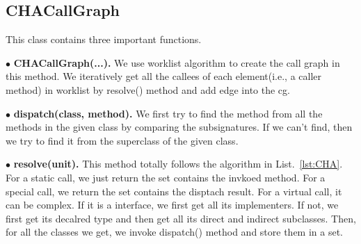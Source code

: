 \documentclass[conference]{IEEEtran}
\begin{document}
\subsection{CHACallGraph}
This class contains three important functions.

\noindent $\bullet$ \textbf{CHACallGraph(...). } We use worklist algorithm to create the  call graph in this method. We iteratively get all the callees of each element(i.e., a caller method) in worklist by resolve() method and add edge into the cg.

\noindent $\bullet$ \textbf{dispatch(class, method). } We first try to find the method from all the methods in the given class by comparing the subsignatures. If we can't find, then we try to find it from the superclass of the given class.

\noindent $\bullet$ \textbf{resolve(unit). } This method totally follows the algorithm in List.~\ref{lst:CHA}. For a static call, we just return the set contains the invkoed method. For a special call, we return the set contains the disptach result. For a virtual call, it can be complex. If it is a interface, we first get all its implementers. If not, we first get its decalred type and then get all its direct and indirect subclasses. Then, for all the classes we get, we invoke dispatch() method and store them in a set.
\end{document}
